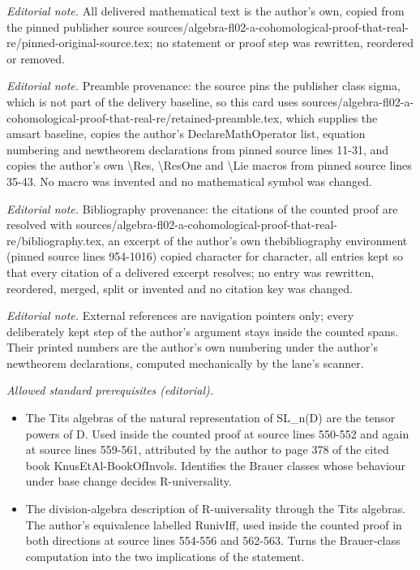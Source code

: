 \maketitle
\noindent\textit{Editorial note.} All delivered mathematical text is the author's own, copied from the pinned publisher source sources/algebra-fl02-a-cohomological-proof-that-real-re/pinned-original-source.tex; no statement or proof step was rewritten, reordered or removed.\par\medskip
\noindent\textit{Editorial note.} Preamble provenance: the source pins the publisher class sigma, which is not part of the delivery baseline, so this card uses sources/algebra-fl02-a-cohomological-proof-that-real-re/retained-preamble.tex, which supplies the amsart baseline, copies the author's DeclareMathOperator list, equation numbering and newtheorem declarations from pinned source lines 11-31, and copies the author's own \textbackslash{}Res, \textbackslash{}ResOne and \textbackslash{}Lie macros from pinned source lines 35-43. No macro was invented and no mathematical symbol was changed.\par\medskip
\noindent\textit{Editorial note.} Bibliography provenance: the citations of the counted proof are resolved with sources/algebra-fl02-a-cohomological-proof-that-real-re/bibliography.tex, an excerpt of the author's own thebibliography environment (pinned source lines 954-1016) copied character for character, all entries kept so that every citation of a delivered excerpt resolves; no entry was rewritten, reordered, merged, split or invented and no citation key was changed.\par\medskip
\noindent\textit{Editorial note.} External references are navigation pointers only; every deliberately kept step of the author's argument stays inside the counted spans. Their printed numbers are the author's own numbering under the author's newtheorem declarations, computed mechanically by the lane's scanner.\par\medskip
\noindent\textit{Allowed standard prerequisites (editorial).}\begin{itemize}
\item The Tits algebras of the natural representation of SL\_n(D) are the tensor powers of D. Used inside the counted proof at source lines 550-552 and again at source lines 559-561, attributed by the author to page 378 of the cited book KnusEtAl-BookOfInvols. Identifies the Brauer classes whose behaviour under base change decides R-universality.
\item The division-algebra description of R-universality through the Tits algebras. The author's equivalence labelled RunivIff, used inside the counted proof in both directions at source lines 554-556 and 562-563. Turns the Brauer-class computation into the two implications of the statement.
\end{itemize}\medskip
